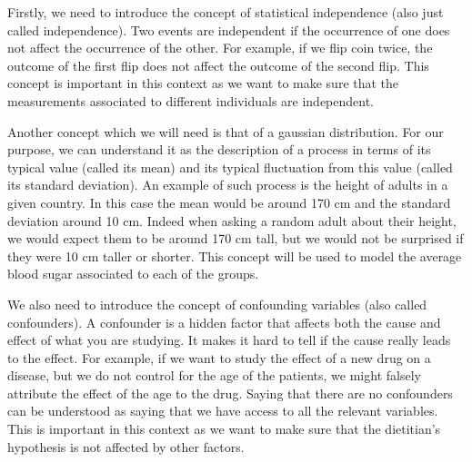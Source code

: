 \documentclass[a4paper, 12pt,oneside]{article}
\begin{document}
	Firstly, we need to introduce the concept of statistical independence (also just called independence). Two events are independent if the occurrence of one does not affect the occurrence of the other. For example, if we flip coin twice, the outcome of the first flip does not affect the outcome of the second flip. This concept is important in this context as we want to make sure that the measurements associated to different individuals are independent.

	Another concept which we will need is that of a gaussian distribution. For our purpose, we can understand it as the description of a process in terms of its typical value (called its mean) and its typical fluctuation from this value (called its standard deviation). An example of such process is the height of adults in a given country. In this case the mean would be around 170 cm and the standard deviation around 10 cm. Indeed when asking a random adult about their height, we would expect them to be around 170 cm tall, but we would not be surprised if they were 10 cm taller or shorter. This concept will be used to model the average blood sugar associated to each of the groups. 

	We also need to introduce the concept of confounding variables (also called confounders). A confounder is a hidden factor that affects both the cause and effect of what you are studying. It makes it hard to tell if the cause really leads to the effect. For example, if we want to study the effect of a new drug on a disease, but we do not control for the age of the patients, we might falsely attribute the effect of the age to the drug. Saying that there are no confounders can be understood as saying that we have access to all the relevant variables. This is important in this context as we want to make sure that the dietitian's hypothesis is not affected by other factors.
\end{document}
